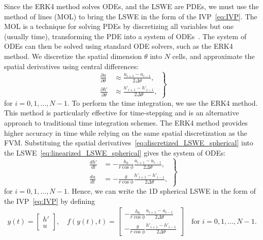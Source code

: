 Since the ERK4 method solves ODEs, and the LSWE are PDEs, we must use the method of lines (MOL) to bring the LSWE in the form of the IVP~\eqref{eq:IVP}.
The MOL is a technique for solving PDEs by discretizing all variables but one (usually time), transforming the PDE into a system of ODEs~\cite{mol}.
The system of ODEs can then be solved using standard ODE solvers, such as the ERK4 method.
We discretize the spatial dimension $\theta$ into $N$ cells, and approximate the spatial derivatives using central differences:
\begin{equation}\label{eq:discretized_LSWE_spherical}
    \left.
    \begin{aligned}
        \frac{\partial u}{\partial \theta} &\approx \frac{u_{i+1} - u_{i-1}}{2 \Delta \theta}, \\
        \frac{\partial h'}{\partial \theta} &\approx \frac{h'_{i+1} - h'_{i-1}}{2 \Delta \theta},
    \end{aligned}
    \right\}
\end{equation}
for $i = 0,1, \dots, N-1$.
To perform the time integration, we use the ERK4 method.
This method is particularly effective for time-stepping and is an alternative approach to traditional time integration schemes.
The ERK4 method provides higher accuracy in time while relying on the same spatial discretization as the FVM.
Substituing the spatial derivatives~\eqref{eq:discretized_LSWE_spherical} into the LSWE~\eqref{eq:linearized_LSWE_spherical} gives the system of ODEs:
\begin{equation}\label{eq:ODE_LSWE_spherical}
    \left.
    \begin{aligned}
        \frac{d h'}{dt} &= -\frac{h_0}{r \cos\phi} \frac{u_{i+1} - u_{i-1}}{2 \Delta \theta}, \\
        \frac{d u}{dt} &= -\frac{g}{r \cos\phi} \frac{h'_{i+1} - h'_{i-1}}{2 \Delta \theta},
    \end{aligned}
    \right\}
\end{equation}
for $i = 0,1, \dots, N-1$.
Hence, we can write the 1D spherical LSWE in the form of the IVP~\eqref{eq:IVP} by defining 
\begin{align}\label{eq:IVP_LSWE_spherical}
    y(t) = \begin{bmatrix}
        h' \\ u
    \end{bmatrix},
    \quad 
    f(y(t),t) = \begin{bmatrix}
        -\frac{h_0}{r \cos\phi} \frac{u_{i+1} - u_{i-1}}{2 \Delta \theta} \\ -\frac{g}{r \cos\phi} \frac{h'_{i+1} - h'_{i-1}}{2 \Delta \theta}
    \end{bmatrix}
    \quad \text{for } i = 0,1, \dots, N-1. 
\end{align}

